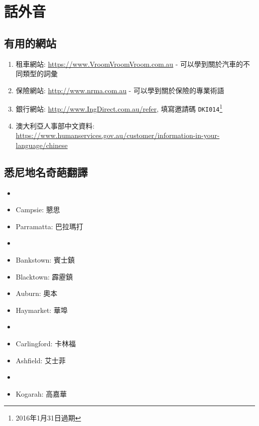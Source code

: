 \chapter{話外音}
\section{有用的網站}
\begin{enumerate}
  \itemsep0em
  \item 租車網站: \url{https://www.VroomVroomVroom.com.au} - 可以學到關於汽車的不同類型的詞彙
  \item 保險網站: \url{http://www.nrma.com.au} - 可以學到關於保險的專業術語
  \item 銀行網站: \url{http://www.IngDirect.com.au/refer}, 填寫邀請碼 \texttt{DKI014}\footnote{2016年1月31日過期}
  \item 澳大利亞人事部中文資料: \url{https://www.humanservices.gov.au/customer/information-in-your-language/chinese}
\end{enumerate}

\section{悉尼地名奇葩翻譯}
\begin{multicols}{3}
\begin{itemize}
  \itemsep0em
  \item {}
  \item Campsie: 懇思
  \item Parramatta: 巴拉瑪打
  \item {}
  \item Bankstown: 賓士鎮
  \item Blacktown: 霹靂鎮
  \item Auburn: 奧本
  \item Haymarket: 華埠
  \item {}
  \item Carlingford: 卡林福
  \item Ashfield: 艾士菲
  \item {}
  \item Kogarah: 高嘉華
\end{itemize}
\end{multicols}

